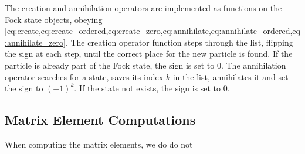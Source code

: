 \documentclass[../main/report.tex]{subfiles}
\begin{document}
The creation and annihilation operators are implemented as functions on the Fock state objects, obeying
\cref{eq:create,eq:create_ordered,eq:create_zero,eq:annihilate,eq:annihilate_ordered,eq:annihilate_zero}.
The creation operator function steps through the list, flipping the sign at each step, until the correct place for the new particle is found. 
If the particle is already part of the Fock state, the sign is set to 0.
The annihilation operator searches for a state, saves its index $k$ in the list, annihilates it and set the sign to $(-1)^k$. If the state not exists, the sign is set to 0.

\subsection{Matrix Element Computations}

When computing the matrix elements, we do do not
\end{document}
